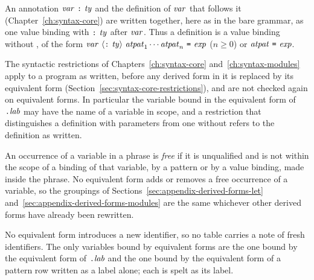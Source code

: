 An annotation $\mathit{var}\ \textnormal{\texttt{:}}\ \mathit{ty}$ and the definition of $\mathit{var}$ that follows it
(Chapter~\ref{ch:syntax-core}) are written together, here as in the bare
grammar, as one value binding with $\textnormal{\texttt{:}}\ \mathit{ty}$ after $\mathit{var}$. Thus a
definition is a value binding without , of the form
$\var\ \opt{\kw{:}\ \ty}\ \atpat_1\cdots\atpat_n\ \kw{=}\ \expm$ ($n\geq 0$)
or $\mathit{atpat}\ \textnormal{\texttt{=}}\ \mathit{exp}$.

The syntactic restrictions of Chapters~\ref{ch:syntax-core}
and~\ref{ch:syntax-modules} apply to a program as written, before any derived
form in it is replaced by its equivalent form
(Section~\ref{sec:syntax-core-restrictions}), and are not checked again on
equivalent forms. In
particular the variable bound in the equivalent form of $\textnormal{\texttt{.}}\mathit{lab}$ may have
the name of a variable in scope, and a restriction that distinguishes a
definition with parameters from one without refers to the definition as
written. %

An occurrence of a variable in a phrase is \emph{free} if it is unqualified
and is not within the scope of a binding of that variable, by a pattern or by
a value binding, made inside the phrase. No equivalent form adds or removes a
free occurrence of a variable, so the groupings of
Sections~\ref{sec:appendix-derived-forms-let}
and~\ref{sec:appendix-derived-forms-modules} are the same whichever other
derived forms have already been rewritten.

No equivalent form introduces a new identifier, so no table carries a note of
fresh identifiers. %
The only variables bound by equivalent forms are the one bound by the
equivalent form of $\textnormal{\texttt{.}}\mathit{lab}$ and the one bound by the equivalent form of a
pattern row written as a label alone; each is spelt as its label.


